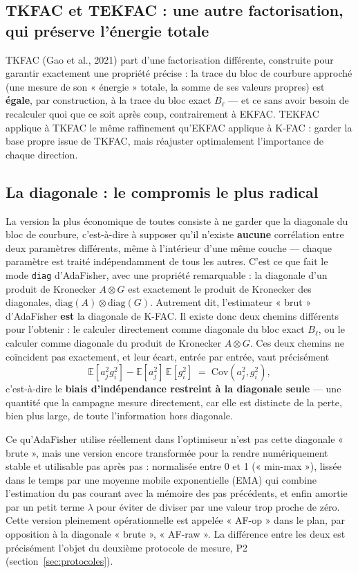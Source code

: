 \documentclass[11pt,a4paper]{article}
\begin{document}
\subsection{TKFAC et TEKFAC : une autre factorisation, qui préserve l'énergie totale}

TKFAC (Gao et al., 2021) part d'une factorisation différente, construite pour garantir exactement
une propriété précise : la trace du bloc de courbure approché (une mesure de son « énergie » totale,
la somme de ses valeurs propres) est \textbf{égale}, par construction, à la trace du bloc exact
$B_\ell$ — et ce sans avoir besoin de recalculer quoi que ce soit après coup, contrairement à EKFAC.
TEKFAC applique à TKFAC le même raffinement qu'EKFAC applique à K-FAC : garder la base propre issue
de TKFAC, mais réajuster optimalement l'importance de chaque direction.

\subsection{La diagonale : le compromis le plus radical}

La version la plus économique de toutes consiste à ne garder que la diagonale du bloc de courbure,
c'est-à-dire à supposer qu'il n'existe \textbf{aucune} corrélation entre deux paramètres différents,
même à l'intérieur d'une même couche — chaque paramètre est traité indépendamment de tous les
autres. C'est ce que fait le mode \texttt{diag} d'AdaFisher, avec une propriété remarquable : la
diagonale d'un produit de Kronecker $A\otimes G$ est exactement le produit de Kronecker des
diagonales, $\mathrm{diag}(A)\otimes\mathrm{diag}(G)$. Autrement dit, l'estimateur « brut »
d'AdaFisher \textbf{est} la diagonale de K-FAC. Il existe donc deux chemins différents pour
l'obtenir : le calculer directement comme diagonale du bloc exact $B_\ell$, ou le calculer comme
diagonale du produit de Kronecker $A\otimes G$. Ces deux chemins ne coïncident pas exactement, et leur
écart, entrée par entrée, vaut précisément
\[
\mathbb E[a_j^2 g_i^2] - \mathbb E[a_j^2]\,\mathbb E[g_i^2] \;=\; \mathrm{Cov}(a_j^2, g_i^2),
\]
c'est-à-dire le \textbf{biais d'indépendance restreint à la diagonale seule} — une quantité que la
campagne mesure directement, car elle est distincte de la perte, bien plus large, de toute
l'information hors diagonale.

Ce qu'AdaFisher utilise réellement dans l'optimiseur n'est pas cette diagonale « brute », mais une
version encore transformée pour la rendre numériquement stable et utilisable pas après pas :
normalisée entre 0 et 1 (« min-max »), lissée dans le temps par une moyenne mobile exponentielle
(EMA) qui combine l'estimation du pas courant avec la mémoire des pas précédents, et enfin amortie
par un petit terme $\lambda$ pour éviter de diviser par une valeur trop proche de zéro. Cette version
pleinement opérationnelle est appelée « AF-op » dans le plan, par opposition à la diagonale « brute »,
« AF-raw ». La différence entre les deux est précisément l'objet du deuxième protocole de mesure,
P2 (section~\ref{sec:protocoles}).
\end{document}
